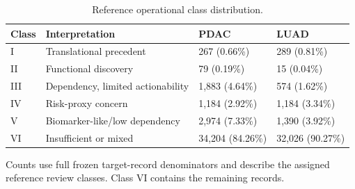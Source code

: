 \begin{table}[!tbp]
\centering\small
\caption{Reference operational class distribution.}\label{tab:review-class-sizes}
\begin{tabularx}{\textwidth}{p{}Yp{.22\textwidth}p{.22\textwidth}}\toprule
Class & Interpretation & PDAC & LUAD \\ \midrule
I & Translational precedent & 267 (0.66\%) & 289 (0.81\%) \\
II & Functional discovery & 79 (0.19\%) & 15 (0.04\%) \\
III & Dependency, limited actionability & 1,883 (4.64\%) & 574 (1.62\%) \\
IV & Risk-proxy concern & 1,184 (2.92\%) & 1,184 (3.34\%) \\
V & Biomarker-like/low dependency & 2,974 (7.33\%) & 1,390 (3.92\%) \\
VI & Insufficient or mixed & 34,204 (84.26\%) & 32,026 (90.27\%) \\
\bottomrule\end{tabularx}
\parbox{\textwidth}{\footnotesize Counts use full frozen target-record denominators and describe the assigned reference review classes. Class VI contains the remaining records.}
\end{table}
